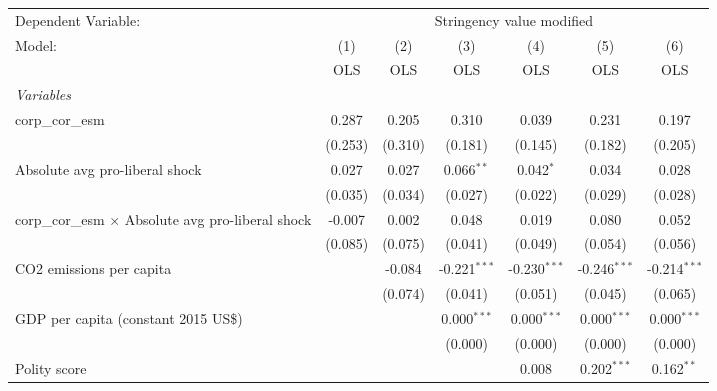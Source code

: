 
\begingroup
\centering
\begin{tabular}{lcccccc}
   \toprule
   Dependent Variable: & \multicolumn{6}{c}{Stringency value modified}\\
   Model:                                                    & (1)     & (2)     & (3)            & (4)            & (5)            & (6)\\  
                                                             &  OLS    & OLS     & OLS            & OLS            & OLS            & OLS\\  
   \midrule
   \emph{Variables}\\
   corp\_cor\_esm                                            & 0.287   & 0.205   & 0.310          & 0.039          & 0.231          & 0.197\\   
                                                             & (0.253) & (0.310) & (0.181)        & (0.145)        & (0.182)        & (0.205)\\   
   Absolute avg pro-liberal shock                            & 0.027   & 0.027   & 0.066$^{**}$   & 0.042$^{*}$    & 0.034          & 0.028\\   
                                                             & (0.035) & (0.034) & (0.027)        & (0.022)        & (0.029)        & (0.028)\\   
   corp\_cor\_esm $\times$ Absolute avg pro-liberal shock    & -0.007  & 0.002   & 0.048          & 0.019          & 0.080          & 0.052\\   
                                                             & (0.085) & (0.075) & (0.041)        & (0.049)        & (0.054)        & (0.056)\\   
   CO2 emissions per capita                                  &         & -0.084  & -0.221$^{***}$ & -0.230$^{***}$ & -0.246$^{***}$ & -0.214$^{***}$\\   
                                                             &         & (0.074) & (0.041)        & (0.051)        & (0.045)        & (0.065)\\   
   GDP per capita (constant 2015 US\$)                       &         &         & 0.000$^{***}$  & 0.000$^{***}$  & 0.000$^{***}$  & 0.000$^{***}$\\   
                                                             &         &         & (0.000)        & (0.000)        & (0.000)        & (0.000)\\   
   Polity score                                              &         &         &                & 0.008          & 0.202$^{***}$  & 0.162$^{**}$\\   

\end{tabular}
